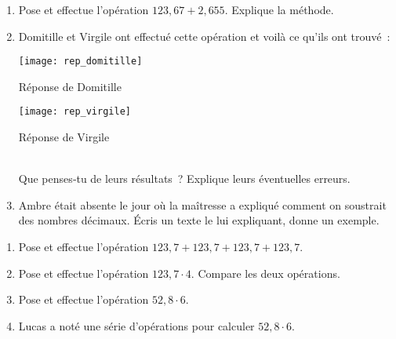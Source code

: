 
\begin{activite}

\begin{partie}
\begin{enumerate}
 \item Pose et effectue l'opération $123,67 + 2,655$. Explique la méthode.
 \item Domitille et Virgile ont effectué cette opération et voilà ce qu'ils ont trouvé :\\[0.5em]
 
 \begin{minipage}[t]{.36\textwidth}
 
 \begin{center}\texttt{[image: rep\_domitille]}
 
 Réponse de Domitille \end{center}
 \end{minipage}\hfill%
 \begin{minipage}[t]{.54\textwidth}
 
 \begin{center}\texttt{[image: rep\_virgile]}
 
 Réponse de Virgile \end{center}
  \end{minipage}\\
 
 Que penses‑tu de leurs résultats ? Explique leurs éventuelles erreurs.
 \item Ambre était absente le jour où la maîtresse a expliqué comment on soustrait des nombres décimaux. Écris un texte le lui expliquant, donne un exemple.
 \end{enumerate}
\end{partie}

\begin{partie}
\begin{enumerate}
 \item Pose et effectue l'opération $123,7 + 123,7 + 123,7 + 123,7$.
 \item Pose et effectue l'opération $123,7 \cdot 4$. Compare les deux opérations.
 \item Pose et effectue l'opération $52,8 \cdot 6$.
 \item Lucas a noté une série d'opérations pour calculer $52,8 \cdot 6$. \\[-1em]
 

\end{enumerate}
\end{partie}
\end{activite}
